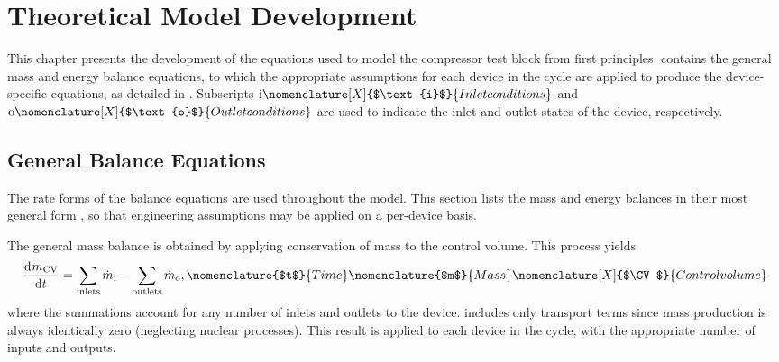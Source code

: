 \chapter{Theoretical Model Development} \label{cha:modeldev}
This chapter presents the development of the equations used to model 
the compressor test block from first principles. 
 contains the general mass and energy balance equations, 
to which the appropriate assumptions for each device in the cycle are applied 
to produce the device-specific equations, as detailed in . 
Subscripts $\text{i}\nomenclature[X]{$\text{i}$}{Inlet conditions}$ 
and $\text{o}\nomenclature[X]{$\text{o}$}{Outlet conditions}$ 
are used to indicate the inlet and outlet states of the device, respectively. 

\section{General Balance Equations} \label{sec:GenBal}
The rate forms of the balance equations are used throughout the model.
This section lists the mass and energy balances in their most general form \parencite{cengel2011}, 
so that engineering assumptions may be applied on a per-device basis.

The general mass balance is obtained by 
applying conservation of mass to the control volume. 
This process yields
\begin{equation}
	\dod{m_\CV}{t} = \sum_{\text{inlets}}{\dot{m}_\inl} - \sum_{\text{outlets}}{\dot{m}_\out},
  \label{eqn:GenMass}
	\nomenclature{$t$}{Time\nomunit{\minute}} 
  \nomenclature{$m$}{Mass\nomunit{\poundmass}} 
	\nomenclature[X]{$\CV$}{Control volume}
\end{equation}
where the summations account for any number of inlets and outlets to the device.
 includes only transport terms since mass production is 
always identically zero (neglecting nuclear processes).
This result is applied to each device in the cycle, with the appropriate number of inputs and outputs.

